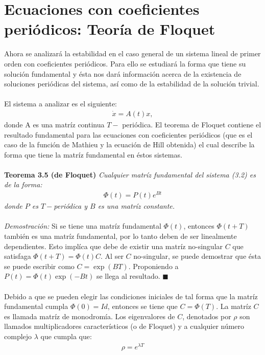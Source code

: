 \section{Ecuaciones con coeficientes periódicos: Teoría de Floquet}
Ahora se analizará la estabilidad en el caso general de un sistema lineal de primer orden con coeficientes periódicos. Para ello se estudiará la forma que tiene su solución fundamental y ésta nos dará información acerca de la existencia de soluciones periódicas del sistema, así como de la estabilidad de la solución trivial.
\\
\\
El sistema a analizar es el siguiente:
\begin{eqnarray}
\dot{x}=A(t)x,
\end{eqnarray}
donde A es una matríz continua $T-$ periódica. El teorema de Floquet contiene el resultado fundamental para las ecuaciones con coeficientes periódicos (que es el caso de la función de Mathieu y la ecuación de Hill obtenida) el cual describe la forma que tiene la matríz fundamental en éstos sistemas.
\\
\\
\textbf{Teorema 3.5 (de Floquet)} \textit{Cualquier matríz fundamental del sistema (3.2) es de la forma:}
\begin{eqnarray*}
\Phi (t)=P(t)e^{Bt}
\end{eqnarray*}
\textit{donde $P$ es $T-$periódica y $B$ es una matríz constante.}
\\
\\
\textit{Demostración:} Si se tiene una matríz fundamental $\Phi(t)$, entonces $\Phi(t+T)$ también es una matríz fundamental, por lo tanto deben de ser linealmente dependientes. Esto implíca que debe de existir una matríz no-singular $C$ que satisfaga $\Phi(t+T)=\Phi(t)C$. Al ser $C$ no-singular, se puede demostrar \citep{hale} que ésta se puede escribir como $C=\exp(BT)$. Proponiendo a $P(t)=\Phi(t)\exp(-Bt)$ se llega al resultado. $\blacksquare$
\\
\\
Debido a que se pueden elegir las condiciones iniciales de tal forma que la matríz fundamental cumpla $\Phi(0)=Id$, entonces se tiene que $C=\Phi(T)$. La matríz $C$ es llamada matríz de monodromía. Los eigenvalores de $C$, denotados por $\rho$ son llamados multiplicadores característicos (o de Floquet) y a cualquier número complejo $\lambda$ que cumpla que:
\begin{eqnarray*}
\rho=e^{\lambda T}
\end{eqnarray*} 
